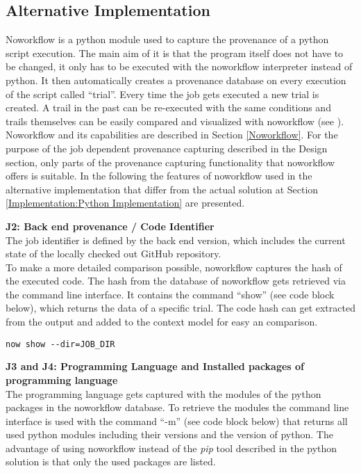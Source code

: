 \documentclass[draft,final]{vutinfth} %
\begin{document}
\subsection{Alternative Implementation}\label{Implementation:Noworkflow Implementation}
Noworkflow is a python module used to capture the provenance of a python script execution. The main aim of it is that the program itself does not have to be changed, it only has to be executed with the noworkflow interpreter instead of python. It then automatically creates a provenance database on every execution of the script called “trial”. Every time the job gets executed a new trial is created. A trail in the past can be re-executed with the same conditions and trails themselves can be easily compared and visualized with noworkflow (see \cite{c9e0604becba42af96a9cb0a6f60018b}). Noworkflow and its capabilities are described in Section \ref{Noworkflow}. 
For the purpose of the job dependent provenance capturing described in the Design section, only parts of the provenance capturing functionality that noworkflow offers is suitable. In the following the features of noworkflow used in the alternative implementation that differ from the actual solution at Section \ref{Implementation:Python Implementation} are presented.    


\textbf{J2: Back end provenance / Code Identifier} \\
The job identifier is defined by the back end version, which includes the current state of the locally checked out GitHub repository.\\
To make a more detailed comparison possible, noworkflow captures the hash of the executed code. The hash from the database of noworkflow gets retrieved via the command line interface. It contains the command “show” (see code block below), which returns the data of a specific trial. The code hash can get extracted from the output and added to the context model for easy an comparison. 

\begin{lstlisting}[frame=single]
now show --dir=JOB_DIR
\end{lstlisting}

\textbf{J3 and J4: Programming Language and  Installed packages of programming language} \\
The programming language gets captured with the modules of the python packages in the noworkflow database. To retrieve the modules the command line interface is used with the command “-m” (see code block below) that returns all used python modules including their versions and the version of python. The advantage of using noworkflow instead of the \textit{pip} tool described in the python solution is that only the used packages are listed.
\end{document}
